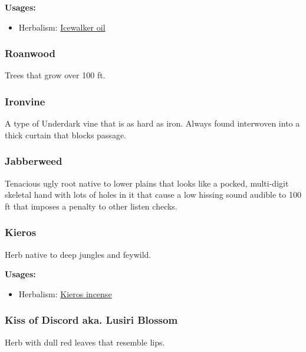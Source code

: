 \vspace{5mm}

\textbf{Usages:}

\begin{itemize}[noitemsep]
\item[] Herbalism: \hyperref[Icewalker oil]{Icewalker oil}
\end{itemize}

\subsubsection{Roanwood}

Trees that grow over 100 ft.

\subsubsection{Ironvine}

A type of Underdark vine that is as hard as iron. Always found interwoven into a thick curtain that blocks passage.

\subsubsection{Jabberweed}

Tenacious ugly root native to lower plains that looks like a pocked, multi-digit skeletal hand with lots of holes in it that cause a low hissing sound audible to 100 ft that imposes a penalty to other listen checks. 

\subsubsection{Kieros}
\label{Kieros}

Herb native to deep jungles and feywild.

\vspace{5mm}

\textbf{Usages:}

\begin{itemize}[noitemsep]
\item[] Herbalism: \hyperref[Kieros incense]{Kieros incense}
\end{itemize}

\subsubsection{Kiss of Discord aka. Lusiri Blossom}
\label{Kiss of Discord}

Herb with dull red leaves that resemble lips.

